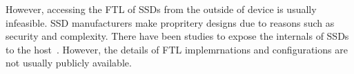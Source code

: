 However, accessing the FTL of SSDs from the outside of device is usually infeasible.
SSD manufacturers make propritery designs due to reasons such as security and complexity.
There have been studies to expose the internals of SSDs to the host~\cite{ocssd,zns,fdp}.
However, the details of FTL implemrnations and configurations are not usually publicly available.
